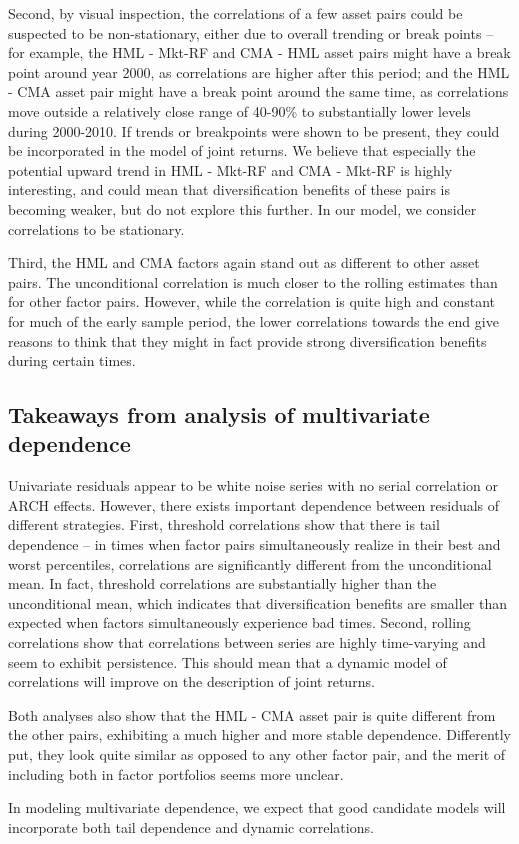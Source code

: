 Second, by visual inspection, the correlations of a few asset pairs could be suspected to be non-stationary, either due to overall trending or break points -- for example, the HML - Mkt-RF and CMA - HML asset pairs might have a break point around year 2000, as correlations are higher after this period; and the HML - CMA asset pair might have a break point around the same time, as correlations move outside a relatively close range of 40-90\% to substantially lower levels during 2000-2010. If trends or breakpoints were shown to be present, they could be incorporated in the model of joint returns. We believe that especially the potential upward trend in HML - Mkt-RF and CMA - Mkt-RF is highly interesting, and could mean that diversification benefits of these pairs is becoming weaker, but do not explore this further. In our model, we consider correlations to be stationary.

Third, the HML and CMA factors again stand out as different to other asset pairs. The unconditional correlation is much closer to the rolling estimates than for other factor pairs. However, while the correlation is quite high and constant for much of the early sample period, the lower correlations towards the end give reasons to think that they might in fact provide strong diversification benefits during certain times.

\subsection{Takeaways from analysis of multivariate dependence}
Univariate residuals appear to be white noise series with no serial correlation or ARCH effects. However, there exists important dependence between residuals of different strategies. First, threshold correlations show that there is tail dependence -- in times when factor pairs simultaneously realize in their best and worst percentiles, correlations are significantly different from the unconditional mean. In fact, threshold correlations are substantially higher than the unconditional mean, which indicates that diversification benefits are smaller than expected when factors simultaneously experience bad times. Second, rolling correlations show that correlations between series are highly time-varying and seem to exhibit persistence. This should mean that a dynamic model of correlations will improve on the description of joint returns.

Both analyses also show that the HML - CMA asset pair is quite different from the other pairs, exhibiting a much higher and more stable dependence. Differently put, they look quite similar as opposed to any other factor pair, and the merit of including both in factor portfolios seems more unclear.

In modeling multivariate dependence, we expect that good candidate models will incorporate both tail dependence and dynamic correlations.